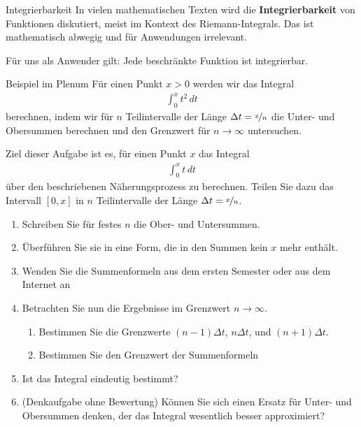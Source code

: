 \begin{frame}{Integrierbarkeit}
    In vielen mathematischen Texten wird die \textbf{Integrierbarkeit} von Funktionen diskutiert, meist im Kontext des Riemann-Integrals. Das ist mathematisch abwegig und für Anwendungen irrelevant.

    \pause

    \begin{block}{Für uns als Anwender gilt:}
        Jede beschränkte Funktion ist integrierbar.
    \end{block}
\end{frame}

\begin{frame}{Beispiel im Plenum}
    Für einen Punkt $x>0$ werden wir das Integral
    \begin{gather*}
        \int_0^x t^2\,dt
    \end{gather*}
    berechnen, indem wir für $n$ Teilintervalle der Länge $\Delta t = \nicefrac xn$ die Unter- und Obersummen berechnen und den Grenzwert für $n\to\infty$ untersuchen.
\end{frame}

\begin{Aufgabe}
  Ziel dieser Aufgabe ist es, für einen Punkt $x$ das Integral
  \begin{gather*}
      \int_0^x t\,dt
  \end{gather*}
  über den beschriebenen Näherungsprozess zu berechnen. Teilen Sie dazu das Intervall $[0,x]$ in $n$ Teilintervalle der Länge $\Delta t = \nicefrac{x}{n}$.
  \begin{enumerate}
      \item Schreiben Sie für festes $n$ die Ober- und Untersummen.
      \item Überführen Sie sie in eine Form, die in den Summen kein $x$ mehr enthält.
      \item Wenden Sie die Summenformeln aus dem ersten Semester oder aus dem Internet an
      \item Betrachten Sie nun die Ergebnisse im Grenzwert $n\to\infty$.
      \begin{enumerate}
          \item Bestimmen Sie die Grenzwerte $(n-1)\Delta t$, $n\Delta t$, und $(n+1)\Delta t$.
          \item Bestimmen Sie den Grenzwert der Summenformeln
      \end{enumerate}
      \item Ist das Integral eindeutig bestimmt?
      \item (Denkaufgabe ohne Bewertung) Können Sie sich einen Ersatz für Unter- und Obersummen denken, der das Integral wesentlich besser approximiert?
  \end{enumerate}
\end{Aufgabe}

